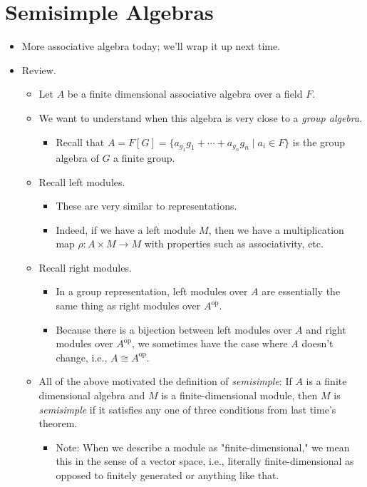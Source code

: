 \documentclass[../notes.tex]{subfiles}
\begin{document}
\section{Semisimple Algebras}
\begin{itemize}
    \item {}More associative algebra today; we'll wrap it up next time.
    \item Review.
    \begin{itemize}
        \item Let $A$ be a finite dimensional associative algebra over a field $F$.
        \item We want to understand when this algebra is very close to a \emph{group algebra}.
        \begin{itemize}
            \item Recall that $A=F[G]=\{a_{g_1}g_1+\cdots+a_{g_n}g_n\mid a_i\in F\}$ is the group algebra of $G$ a finite group.
        \end{itemize}
        \item Recall left modules.
        \begin{itemize}
            \item These are very similar to representations.
            \item Indeed, if we have a left module $M$, then we have a multiplication map $\rho:A\times M\to M$ with properties such as associativity, etc.
        \end{itemize}
        \item Recall right modules.
        \begin{itemize}
            \item In a group representation, left modules over $A$ are essentially the same thing as right modules over $A^\text{op}$.
            \item Because there is a bijection between left modules over $A$ and right modules over $A^\text{op}$, we sometimes have the case where $A$ doesn't change, i.e., $A\cong A^\text{op}$.
        \end{itemize}
        \item All of the above motivated the definition of \emph{semisimple}: If $A$ is a finite dimensional algebra and $M$ is a finite-dimensional module, then $M$ is \emph{semisimple} if it satisfies any one of three conditions from last time's theorem.
        \begin{itemize}
            \item Note: When we describe a module as "finite-dimensional," we mean this in the sense of a vector space, i.e., literally finite-dimensional as opposed to finitely generated or anything like that.

\end{itemize}
\end{itemize}
\end{itemize}
\end{document}
